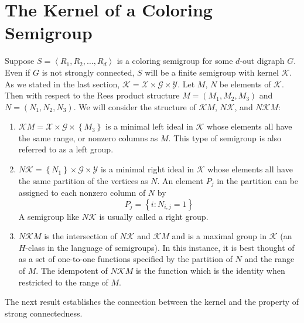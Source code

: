

\section{The Kernel of a Coloring Semigroup}  
\label{sec:4.3}


Suppose $S=\left\langle R_1,R_2,\dots,R_d\right\rangle$ is a coloring
semigroup for some $d$-out digraph $G$. 
Even if $G$ is not strongly connected, $S$ will be a finite semigroup with kernel $\mathcal{K}$. As we stated in the last section, $\mathcal{K} = \mathcal{X} \times \mathcal{G} \times \mathcal{Y}$. 
Let $M$, $N$ be elements of $\mathcal{K}$. 
Then with respect to the Rees product structure $M=\left( M_1,M_2,M_3\right) $ and $N=\left( N_1,N_2 ,N_3\right) $. 
We will consider the structure of $\mathcal{K}M$, $N\mathcal{K}$, and $N\mathcal{K}M$:

\vphantom{...}
%
\begin{enumerate}
\item[(1)] $\mathcal{K}M = \mathcal{X} \times \mathcal{G} \times \left\{M_3\right\}$ is a minimal left ideal in $\mathcal{K}$ whose elements all have the same range, or nonzero columns as $M$. 
This type of semigroup is also referred to as a left group. 

\vphantom{...}
\item[(2)] $N\mathcal{K} = \left\{N_1\right\} \times \mathcal{G} \times \mathcal{Y}$ is a minimal right ideal in $\mathcal{K}$ whose elements all have the same partition of the vertices as $N$. 
An element $P_j$ in the partition can be assigned to each nonzero column of $N$ by 
\[
P_j =\left\{ i : N_{i,j}=1\right\}
\]
A semigroup like $N\mathcal{K}$ is usually called a right group.

\vphantom{...}
\item[(3)] $N\mathcal{K}M$ is the intersection of $N\mathcal{K}$ and $\mathcal{K}M$ and is a maximal group in $\mathcal{K}$ (an $H$-class in the language of semigroups). 
In this instance, it is best thought of as a set of one-to-one functions specified by the partition of $N$ and the range of $M$. 
The idempotent of $N\mathcal{K}M$ is the function which is the identity when
restricted to the range of $M$.
\end{enumerate}
%

\vphantom{...}

The next result establishes the connection between the kernel and the
property of strong connectedness.

